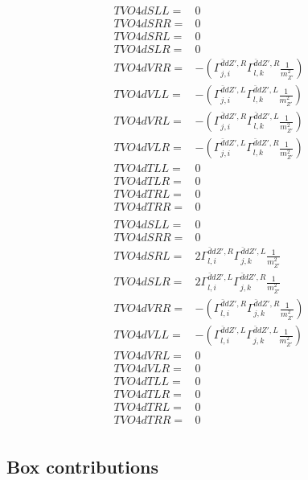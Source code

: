\documentclass[A4,landscape]{article}
\begin{document}
\begin{align} 
  TVO4dSLL= & 0 \\ 
  TVO4dSRR= & 0 \\ 
  TVO4dSRL= & 0 \\ 
  TVO4dSLR= & 0 \\ 
  TVO4dVRR= & -(\Gamma^{\bar{d}d {Z'} ,R}_{j, i} \Gamma^{\bar{d}d {Z'} ,R}_{l, k} \frac{1}{m^2_{{Z'}}}) \\ 
  TVO4dVLL= & -(\Gamma^{\bar{d}d {Z'} ,L}_{j, i} \Gamma^{\bar{d}d {Z'} ,L}_{l, k} \frac{1}{m^2_{{Z'}}}) \\ 
  TVO4dVRL= & -(\Gamma^{\bar{d}d {Z'} ,R}_{j, i} \Gamma^{\bar{d}d {Z'} ,L}_{l, k} \frac{1}{m^2_{{Z'}}}) \\ 
  TVO4dVLR= & -(\Gamma^{\bar{d}d {Z'} ,L}_{j, i} \Gamma^{\bar{d}d {Z'} ,R}_{l, k} \frac{1}{m^2_{{Z'}}}) \\ 
  TVO4dTLL= & 0 \\ 
  TVO4dTLR= & 0 \\ 
  TVO4dTRL= & 0 \\ 
  TVO4dTRR= & 0 \\ 
\end{align} 
\begin{align} 
  TVO4dSLL= & 0 \\ 
  TVO4dSRR= & 0 \\ 
  TVO4dSRL= & 2 \Gamma^{\bar{d}d {Z'} ,R}_{l, i} \Gamma^{\bar{d}d {Z'} ,L}_{j, k} \frac{1}{m^2_{{Z'}}} \\ 
  TVO4dSLR= & 2 \Gamma^{\bar{d}d {Z'} ,L}_{l, i} \Gamma^{\bar{d}d {Z'} ,R}_{j, k} \frac{1}{m^2_{{Z'}}} \\ 
  TVO4dVRR= & -(\Gamma^{\bar{d}d {Z'} ,R}_{l, i} \Gamma^{\bar{d}d {Z'} ,R}_{j, k} \frac{1}{m^2_{{Z'}}}) \\ 
  TVO4dVLL= & -(\Gamma^{\bar{d}d {Z'} ,L}_{l, i} \Gamma^{\bar{d}d {Z'} ,L}_{j, k} \frac{1}{m^2_{{Z'}}}) \\ 
  TVO4dVRL= & 0 \\ 
  TVO4dVLR= & 0 \\ 
  TVO4dTLL= & 0 \\ 
  TVO4dTLR= & 0 \\ 
  TVO4dTRL= & 0 \\ 
  TVO4dTRR= & 0 \\ 
\end{align} 
\subsection{Box contributions} 
\end{document}
